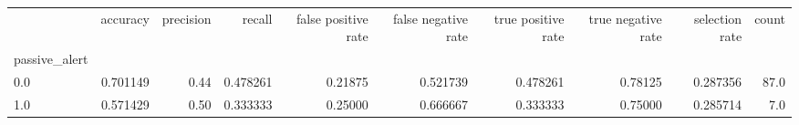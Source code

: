 \begin{tabular}{lrrrrrrrrr}
\toprule
{} &  accuracy &  precision &    recall &  false positive rate &  false negative rate &  true positive rate &  true negative rate &  selection rate &  count \\
passive\_alert &           &            &           &                      &                      &                     &                     &                 &        \\
\midrule
0.0           &  0.701149 &       0.44 &  0.478261 &              0.21875 &             0.521739 &            0.478261 &             0.78125 &        0.287356 &   87.0 \\
1.0           &  0.571429 &       0.50 &  0.333333 &              0.25000 &             0.666667 &            0.333333 &             0.75000 &        0.285714 &    7.0 \\
\bottomrule
\end{tabular}
